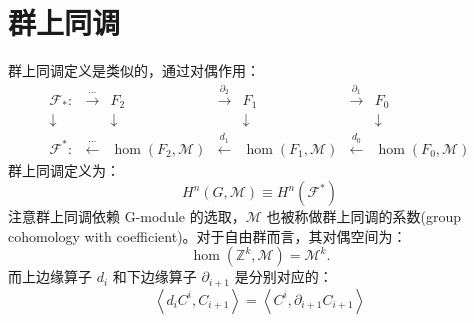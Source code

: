 \documentclass[UTF8]{ctexart}
\begin{document}
\section*{群上同调}
\noindent
群上同调定义是类似的，通过对偶作用：
\begin{equation}
\begin{array}{ccccccc}
\mathcal{F}_{*}: & \stackrel{\cdots}{\longrightarrow} & F_{2} & \stackrel{\partial_{2}}{\longrightarrow} & F_{1} & \stackrel{\partial_{1}}{\longrightarrow} & F_{0}\\
\downarrow &  & \downarrow &  & \downarrow &  & \downarrow\\
\mathcal{F}^{*}: & \stackrel{\cdots}{\longleftarrow} & \hom\left(F_{2},\mathcal{M}\right) & \stackrel{d_{1}}{\longleftarrow} & \hom\left(F_{1},\mathcal{M}\right) & \stackrel{d_{0}}{\longleftarrow} & \hom\left(F_{0},\mathcal{M}\right)
\end{array}
\end{equation}
群上同调定义为：
\begin{equation}
H^{n}\left(G,\mathcal{M}\right)\equiv H^{n}\left(\mathcal{F}^{*}\right)
\end{equation}
注意群上同调依赖 G-module 的选取，$\mathcal{M}$ 也被称做群上同调的系数(group cohomology
with coefficient)。对于自由群而言，其对偶空间为：
\begin{equation}
\hom\left(\mathbb{Z}^{k},\mathcal{M}\right)=\mathcal{M}^{k}.
\end{equation}
而上边缘算子 $d_{i}$ 和下边缘算子 $\partial_{i+1}$ 是分别对应的：
\begin{equation}
\left\langle d_{i}C^{i},C_{i+1}\right\rangle =\left\langle C^{i},\partial_{i+1}C_{i+1}\right\rangle 
\end{equation}
\end{document}
